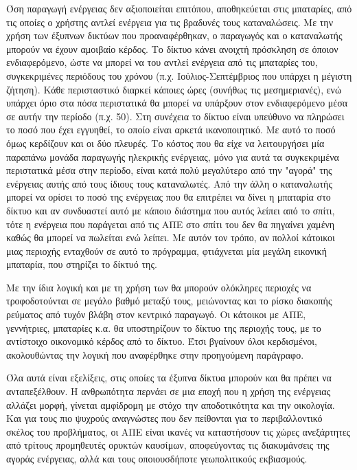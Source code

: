 \documentclass[12pt]{report}
\begin{document}
Όση παραγωγή ενέργειας δεν αξιοποιείται επιτόπου, αποθηκεύεται στις μπαταρίες, από τις οποίες ο χρήστης αντλεί ενέργεια για τις βραδυνές τους καταναλώσεις. Με την χρήση των έξυπνων δικτύων που προαναφέρθηκαν, ο παραγωγός και ο 
καταναλωτής μπορούν να έχουν αμοιβαίο κέρδος. Το δίκτυο κάνει ανοιχτή πρόσκληση σε όποιον ενδιαφερόμενο, ώστε να μπορεί να του αντλεί ενέργεια από τις μπαταρίες του, συγκεκριμένες περιόδους του χρόνου (π.χ. Ιούλιος-Σεπτέμβριος που 
υπάρχει η μέγιστη ζήτηση). Κάθε περισταστικό διαρκεί κάποιες ώρες (συνήθως τις μεσημεριανές), ενώ υπάρχει όριο στα πόσα περιστατικά θα μπορεί να υπάρξουν στον ενδιαφερόμενο μέσα σε αυτήν την περίοδο (π.χ. 50). Στη συνέχεια το δίκτυο 
είναι υπεύθυνο να πληρώσει το ποσό που έχει εγγυηθεί, το οποίο είναι αρκετά ικανοποιητικό. Με αυτό το ποσό όμως κερδίζουν και οι δύο πλευρές. Το κόστος που θα είχε να λειτουργήσει μία παραπάνω μονάδα παραγωγής ηλεκρικής ενέργειας, 
μόνο για αυτά τα συγκεκριμένα περιστατικά μέσα στην περίοδο, είναι κατά πολύ μεγαλύτερο από την "αγορά" της ενέργειας αυτής από τους ίδιους τους καταναλωτές. Από την άλλη ο καταναλωτής μπορεί να ορίσει το ποσό της ενέργειας που θα 
επιτρέπει να δίνει η μπαταρία στο δίκτυο και αν συνδυαστεί αυτό με κάποιο διάστημα που αυτός λείπει από το σπίτι, τότε η ενέργεια που παράγεται από τις ΑΠΕ στο σπίτι του δεν θα πηγαίνει χαμένη καθώς θα μπορεί να πωλείται ενώ λείπει. 
Με αυτόν τον τρόπο, αν πολλοί κάτοικοι μιας περιοχής ενταχθούν σε αυτό το πρόγραμμα, φτιάχνεται μία μεγάλη εικονική μπαταρία, που στηρίζει το δίκτυό της.

Με την ίδια λογική και με τη χρήση των {} θα μπορούν ολόκληρες περιοχές να τροφοδοτούνται σε μεγάλο βαθμό μεταξύ τους, μειώνοντας και το ρίσκο διακοπής ρεύματος από τυχόν βλάβη στον κεντρικό παραγωγό. Οι κάτοικοι
με ΑΠΕ, γεννήτριες, μπαταρίες κ.α. θα υποστηρίζουν το δίκτυο της περιοχής τους, με το αντίστοιχο οικονομικό κέρδος από το δίκτυο. Έτσι βγαίνουν όλοι κερδισμένοι, ακολουθώντας την λογική που αναφέρθηκε στην προηγούμενη παράγραφο.

Όλα αυτά είναι εξελίξεις, στις οποίες τα έξυπνα δίκτυα μπορούν και θα πρέπει να ανταπεξέλθουν. Η ανθρωπότητα περνάει σε μια εποχή που η χρήση της ενέργειας αλλάζει μορφή, γίνεται αμφίδρομη με στόχο την αποδοτικότητα και την οικολογία.
Και για τους πιο ψυχρούς αναγνώστες που δεν πείθονται για το περιβαλλοντικό σκέλος του προβλήματος, οι ΑΠΕ είναι ικανές να καταστήσουν τις χώρες ανεξάρτητες από τρίτους προμηθευτές ορυκτών καυσίμων, αποφεύγοντας τις διακυμάνσεις της 
αγοράς ενέργειας, αλλά και τους οποιουσδήποτε γεωπολιτικούς εκβιασμούς.
\end{document}
